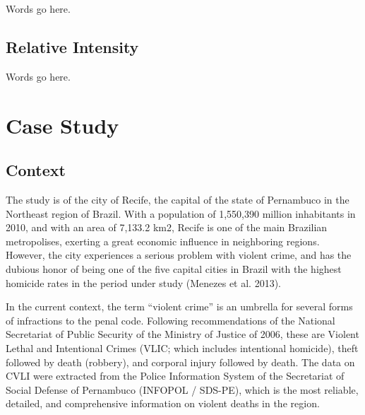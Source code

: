 \documentclass[smallextended]{svjour3}       %
\begin{document}
Words go here.

\hypertarget{relative-intensity}{%
\subsection{Relative Intensity}\label{relative-intensity}}

Words go here.

\hypertarget{case}{%
\section{Case Study}\label{case}}

\hypertarget{context}{%
\subsection{Context}\label{context}}

The study is of the city of Recife, the capital of the state of
Pernambuco in the Northeast region of Brazil. With a population of
1,550,390 million inhabitants in 2010, and with an area of 7,133.2 km2,
Recife is one of the main Brazilian metropolises, exerting a great
economic influence in neighboring regions. However, the city experiences
a serious problem with violent crime, and has the dubious honor of being
one of the five capital cities in Brazil with the highest homicide rates
in the period under study (Menezes et al. 2013).

In the current context, the term ``violent crime'' is an umbrella for
several forms of infractions to the penal code. Following
recommendations of the National Secretariat of Public Security of the
Ministry of Justice of 2006, these are Violent Lethal and Intentional
Crimes (VLIC; which includes intentional homicide), theft followed by
death (robbery), and corporal injury followed by death. The data on CVLI
were extracted from the Police Information System of the Secretariat of
Social Defense of Pernambuco (INFOPOL / SDS-PE), which is the most
reliable, detailed, and comprehensive information on violent deaths in
the region.
\end{document}
